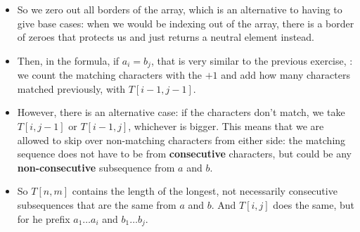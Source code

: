\begin{itemize}
\item So we zero out all borders of the array, which is an alternative to having to give base cases: when we would be indexing out of the array, there is a border of zeroes that protects us and just returns a neutral element instead.
\item Then, in the formula, if $a_i = b_j$, that is very similar to the previous exercise, : we count the matching characters with the $+1$ and add how many characters matched previously, with $T[i-1, j-1]$.
\item However, there is an alternative case: if the characters don't match, we take $T[i,j-1]$ or $T[i-1,j]$, whichever is bigger. This means that we are allowed to skip over non-matching characters from either side: the matching sequence does not have to be from \textbf{consecutive} characters, but could be any \textbf{non-consecutive} subsequence from $a$ and $b$.
\item So $T[n,m]$ contains the length of the longest, not necessarily consecutive subsequences that are the same from $a$ and $b$. And $T[i,j]$ does the same, but for he prefix $a_1\dots{}a_i$ and $b_1\dots{}b_j$.
\end{itemize}